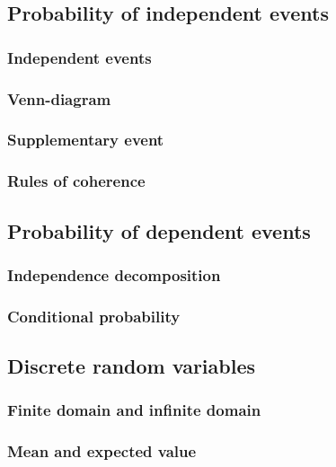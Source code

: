 \documentclass[12pt]{article}
\begin{document}
    \subsection{Probability of independent events}

    \subsubsection*{Independent events}
    
    \subsubsection*{Venn-diagram}

    \subsubsection*{Supplementary event}

    \subsubsection*{Rules of coherence}

    \subsection{Probability of dependent events}

    \subsubsection*{Independence decomposition}

    \subsubsection*{Conditional probability}

    \subsection{Discrete random variables}

    \subsubsection*{Finite domain and infinite domain}

    \subsubsection*{Mean and expected value}
\end{document}
